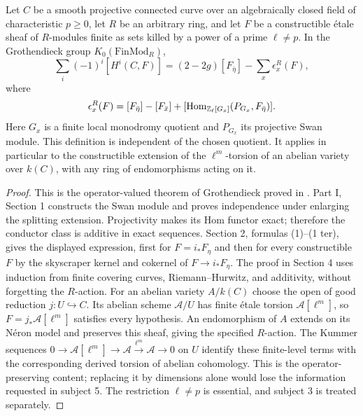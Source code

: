 \begin{theorem}\label{thm:B3-operators}
Let $C$ be a smooth projective connected curve over an algebraically
closed field of characteristic $p\ge0$, let $R$ be an arbitrary ring,
and let $F$ be a constructible \'etale sheaf of $R$-modules finite as sets
killed by a power of a prime $\ell\ne p$. In the Grothendieck group
$K_0(\mathrm{FinMod}_R)$,
\[
 \sum_i(-1)^i[H^i(C,F)]
   =(2-2g)[F_{\bar\eta}]-\sum_x\epsilon_x^R(F),
\]
where
\[
 \epsilon_x^R(F)=
 [F_{\bar\eta}]-[F_{\bar x}]
 +[\operatorname{Hom}_{{\mathbb{Z}}_\ell[G_x]}(P_{G_x},F_{\bar\eta})].
\]
Here $G_x$ is a finite local monodromy quotient and $P_{G_x}$ its
projective Swan module. This definition is independent of the
chosen quotient. It applies in particular to the constructible
extension of the $\ell^m$-torsion of an abelian variety over $k(C)$,
with any ring of endomorphisms acting on it.
\end{theorem}
\begin{proof}
This is the operator-valued theorem of Grothendieck proved in
\cite[Part I, Theorem 1, p.~133]{BRaynaud1966}. Part I, Section 1
constructs the Swan module and proves independence under enlarging
the splitting extension. Projectivity makes its Hom functor exact;
therefore the conductor class is additive in exact sequences.
Section 2, formulas (1)--(1 ter), gives the displayed expression,
first for $F=i_*F_\eta$ and then for every constructible $F$ by the
skyscraper kernel and cokernel of $F\to i_*F_\eta$.
The proof in Section 4 uses induction from finite covering curves,
Riemann--Hurwitz, and additivity, without forgetting the $R$-action.
For an abelian variety $A/k(C)$ choose the open of good reduction
$j:U\hookrightarrow C$. Its abelian scheme $\mathcal A/U$ has finite
\'etale torsion $\mathcal A[\ell^m]$, so
$F=j_*\mathcal A[\ell^m]$ satisfies every hypothesis.
An endomorphism of $A$ extends on its N\'eron model and preserves this
sheaf, giving the specified $R$-action. The Kummer sequences
$0\to\mathcal A[\ell^m]\to\mathcal A\xrightarrow{\ell^m}
\mathcal A\to0$ on $U$ identify these finite-level terms with the
corresponding derived torsion of abelian cohomology. This is the
operator-preserving content; replacing it by dimensions alone would
lose the information requested in subject 5. The restriction
$\ell\ne p$ is essential, and subject 3 is treated separately.
\end{proof}

